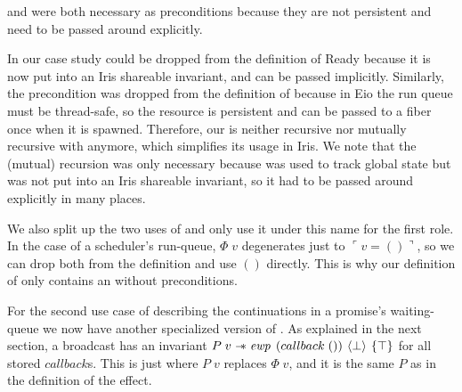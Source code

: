 \gsPInv{} and \gsIsQueue{} were both necessary as preconditions because they are not persistent and need to be passed around explicitly.

In our case study \gsPInv{} could be dropped from the definition of Ready because it is now put into an Iris shareable invariant, and can be passed implicitly.
Similarly, the \gsIsQueue{} precondition was dropped from the definition of \gsReady{} because in Eio the run queue must be thread-safe, so the \gsIsQueue{} resource is persistent and can be passed to a fiber once when it is spawned.
Therefore, our \gsReady{} is neither recursive nor mutually recursive with \gsPInv{} anymore, which simplifies its usage in Iris.
We note that the (mutual) recursion was only necessary because \gsPInv{} was used to track global state but was not put into an Iris shareable invariant, so it had to be passed around explicitly in many places.

We also split up the two uses of \gsReady{} and only use it under this name for the first role.
In the case of a scheduler's run-queue, \(Φ\; v\) degenerates just to \(\ulcorner v = () \urcorner\), so we can drop both from the definition and use \(()\) directly.
This is why our definition of \gsReady{} only contains an \ewpt{} without preconditions.

For the second use case of describing the continuations in a promise's waiting-queue we now have another specialized version of \gsReady{}.
As explained in the next section, a broadcast has an invariant \(P\; v \wand \ewp{callback\; ()}{\bot}{\top}\) for all stored \(callback\)s.
This is just \gsReady{} where \(P\; v\) replaces \(Φ\; v\), and it is the same \(P\) as in the definition of the \esuspend{} effect.
